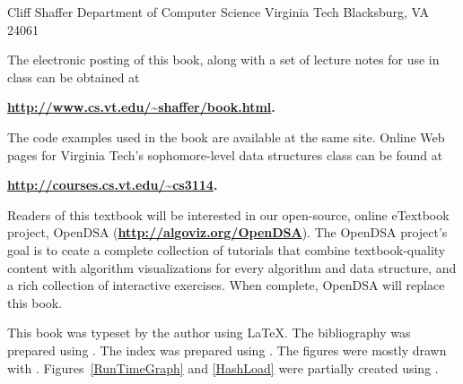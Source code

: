 \medskip

{\obeylines\parskip=-1pt
\qquad Cliff Shaffer
\qquad Department of Computer Science
\qquad Virginia Tech
\qquad Blacksburg, VA 24061
}

\medskip

The electronic posting of this book, along with a
set of lecture notes for use in class can be obtained
at
\begin{center}
\bfseries\url{http://www.cs.vt.edu/~shaffer/book.html}.
\end{center}
The code examples used in the book are available at the same site.
Online Web pages for Virginia Tech's sophomore-level data
structures class can be found at
\begin{center}
\bfseries\url{http://courses.cs.vt.edu/~cs3114}.
\end{center}

Readers of this textbook will be interested in our open-source, online
eTextbook project, OpenDSA ({\bfseries\url{http://algoviz.org/OpenDSA}}).
The OpenDSA project's goal is to ceate a complete collection of
tutorials that combine textbook-quality content with algorithm
visualizations for every algorithm and data structure, and a rich
collection of interactive exercises.
When complete, OpenDSA will replace this book.

This book was typeset by the author using \LaTeX.
The bibliography was prepared using \BibTeX.
The index was prepared using \MakeIndex.
The figures were mostly drawn with \Xfig.
Figures~\ref{RunTimeGraph} and \ref{HashLoad}
were partially created using \Mathematica.



